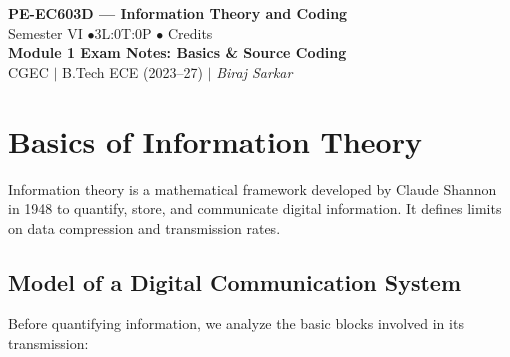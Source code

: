 \documentclass[12pt,a4paper]{article}
\begin{document}

\begin{center}
  {\LARGE\bfseries\color{myred} PE-EC603D --- Information Theory and Coding}\\[5pt]
  {\normalsize\color{mydark} Semester VI \quad$\bullet$\quad 3L:0T:0P \quad$\bullet$ Credits}\\[3pt]
  {\normalsize\color{myteal}\textbf{Module 1 Exam Notes: Basics \& Source Coding}}\\[3pt]
  {\small\color{mydark} CGEC \;$|$\; B.Tech ECE (2023--27) \;$|$\; \textit{Biraj Sarkar}}
\end{center}
\vspace{2pt}
\noindent{\color{myred}\rule{\linewidth}{1.5pt}}
\vspace{2pt}

\hypersetup{linkcolor=mydark}
\tableofcontents
\hypersetup{linkcolor=myteal}
\newpage

\section{Basics of Information Theory}

Information theory is a mathematical framework developed by Claude Shannon in 1948 to quantify, store, and communicate digital information. It defines limits on data compression and transmission rates.

\subsection{Model of a Digital Communication System}
Before quantifying information, we analyze the basic blocks involved in its transmission:
\end{document}
